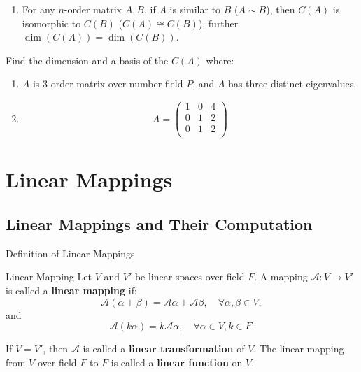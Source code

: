 \documentclass[11pt]{../../TexTemplate/elegantbook} %
\begin{document}
\begin{property}
    \begin{enumerate}
        \item For any \( n \)-order matrix \( A, B \), 
            if \( A \) is similar to \( B \) (\(A \sim B\)), 
            then \( C(A) \) is isomorphic to \( C(B) \) (\(C(A) \cong C(B)\)),
            further \( \dim(C(A)) = \dim(C(B)) \).
    \end{enumerate}    
\end{property}

\begin{example}
    Find the dimension and a basis of the \( C(A) \) where:
    \begin{enumerate}[label=(\roman*)]
        \item \(A\) is \(3\)-order matrix over number field \(P\), and \(A\) has three distinct eigenvalues.
        \item 
            \[
            A = 
            \begin{pmatrix} 1 & 0 & 4 \\ 0 & 1 & 2 \\ 0 & 1 & 2 \\\end{pmatrix}
            \]
    \end{enumerate}
\end{example}

\chapter{Linear Mappings}
\section{Linear Mappings and Their Computation}
\begin{leftbarTitle}{Definition of Linear Mappings}\end{leftbarTitle}
\begin{definition}{Linear Mapping}
    Let \( V \) and \( V' \) be linear spaces over field \( F \).
    A mapping \( \mathcal{A}: V \to V' \) is called a \textbf{linear mapping} if:
    \[
    \mathcal{A}(\alpha + \beta) = \mathcal{A}\alpha + \mathcal{A}\beta, \quad \forall \alpha, \beta \in V,
    \]
    and
    \[
    \mathcal{A}(k\alpha) = k\mathcal{A}\alpha, \quad \forall \alpha \in V, k \in F.
    \]

    If \( V = V' \), then \( \mathcal{A} \) is called a \textbf{linear transformation} of \( V \).
    The linear mapping from \( V \) over field \( F \) to \(F\) is called a \textbf{linear function} on \( V \).
\end{definition}
\end{document}
